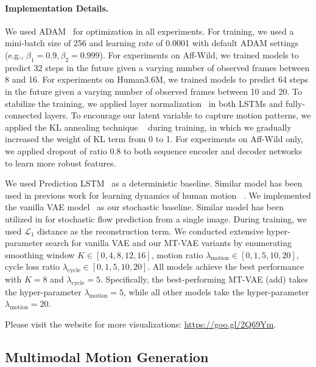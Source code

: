 \documentclass[runningheads]{llncs}
\newcommand{\cutsubsectionup}{\vspace*{-0.1in}}
\newcommand{\cutsubsectiondown}{\vspace*{-0.07in}}
\begin{document}
\paragraph{Implementation Details.}
We used ADAM~\cite{kingma2014adam} for optimization in all experiments.
For training, we used a mini-batch size of 256 and learning rate of 0.0001 with default ADAM settings (e.g., $\beta_1 = 0.9, \beta_2 = 0.999$).
For experiments on Aff-Wild, we trained models to predict 32 steps in the future given a varying number of observed frames between 8 and 16.
For experiments on Human3.6M, we trained models to predict 64 steps in the future given a varying number of observed frames between 10 and 20.
To stabilize the training, we applied layer normalization~\cite{ba2016layer} in both LSTMs and fully-connected layers.
To encourage our latent variable to capture motion patterns, we applied the KL annealing technique ~\cite{bowman2015generating} during training, in which we gradually increased the weight of KL term from 0 to 1.
For experiments on Aff-Wild only, we applied dropout of ratio 0.8 to both sequence encoder and decoder networks to learn more robust features.


We used Prediction LSTM~\cite{villegas2017learning} as a deterministic baseline. Similar model has been used in previous work for learning dynamics of human motion ~\cite{fragkiadaki2015recurrent,chao2017forecasting}.
We implemented the vanilla VAE model~\cite{mohammad2018stochastic} as our stochastic baseline. 
Similar model has been utilized in \cite{xue2016visual,walker2016uncertain,walker2017pose} for stochastic flow prediction from a single image.
During training, we used $\mathcal{L}_1$ distance as the reconstruction term. We conducted extensive hyper-parameter search for vanilla VAE and our MT-VAE variants by enumerating smoothing window $K \in [0, 4, 8, 12, 16]$, motion ratio $\lambda_\text{motion} \in [0, 1, 5, 10, 20]$, cycle loss ratio $\lambda_\text{cycle} \in [0, 1, 5, 10, 20]$.
All models achieve the best performance with $K=8$ and $\lambda_\text{cycle}=5$.
Specifically, the best-performing MT-VAE (add) takes the hyper-parameter $\lambda_\text{motion} = 5$, while all other models take the hyper-parameter $\lambda_\text{motion} = 20$. 


Please visit the website for more visualizations: {\color{blue}\underline{\href{https://goo.gl/2Q69Ym}{https://goo.gl/2Q69Ym}}}.


\cutsubsectionup
\subsection{Multimodal Motion Generation}
\label{sec:exp_seqgen}
\cutsubsectiondown
\end{document}

